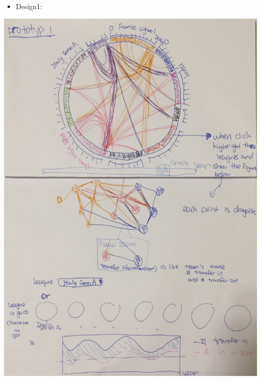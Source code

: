 \documentclass[11pt]{article}
\begin{document}
\begin{itemize}
\item Design1:
\end{itemize}
\includegraphics[width=.9\linewidth]{Design4.png}
\end{document}
